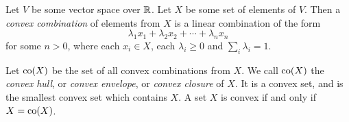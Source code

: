\documentclass[12pt]{article}
\begin{document}
Let $V$ be some vector space over $\Bbb{R}$.  Let $X$ be some set of elements of $V$.  Then a {\it convex combination} of elements from $X$ is a linear combination of the form 
$$\lambda_1 x_1 + \lambda_2 x_2 + \cdots + \lambda_n x_n$$
for some $n > 0$, where each $x_i \in X$, each $\lambda_i \ge 0$ and $\sum_i \lambda_i = 1$.

Let ${\rm co}(X)$ be the set of all convex combinations from $X$.  We call ${\rm co}(X)$ the {\it convex hull}, or {\it convex envelope}, or {\it convex closure} of $X$.  It is a convex set, and is the smallest convex set which contains $X$.  A set $X$ is convex if and only if $X = {\rm co}(X)$.
\end{document}
